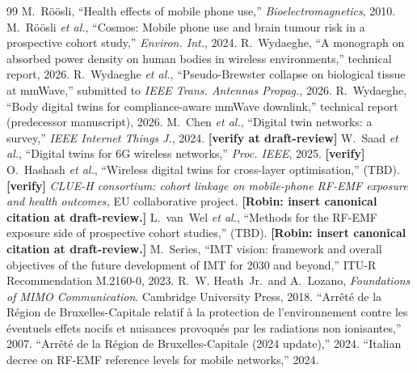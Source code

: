 \documentclass[journal,twocolumn,10pt]{IEEEtran}
\theoremstyle{plain}
\theoremstyle{definition}
\theoremstyle{remark}
\begin{document}
\begin{thebibliography}{99}
 M.~R\"o\"osli, ``Health effects of mobile phone
use,'' \emph{Bioelectromagnetics}, 2010.
 M.~R\"o\"osli \emph{et al.}, ``Cosmos: Mobile
phone use and brain tumour risk in a prospective cohort study,''
\emph{Environ. Int.}, 2024.
 R.~Wydaeghe, ``A monograph on absorbed
power density on human bodies in wireless environments,'' technical
report, 2026.
 R.~Wydaeghe \emph{et al.}, ``Pseudo-Brewster
collapse on biological tissue at mmWave,'' submitted to \emph{IEEE
Trans. Antennas Propag.}, 2026.
 R.~Wydaeghe, ``Body digital twins for
compliance-aware mmWave downlink,'' technical report (predecessor
manuscript), 2026.
 M.~Chen \emph{et al.}, ``Digital twin
networks: a survey,'' \emph{IEEE Internet Things J.}, 2024.
\textbf{[verify at draft-review]}
 W.~Saad \emph{et al.}, ``Digital twins for
6G wireless networks,'' \emph{Proc. IEEE}, 2025. \textbf{[verify]}
 O.~Hashash \emph{et al.}, ``Wireless
digital twins for cross-layer optimisation,'' (TBD).
\textbf{[verify]}
 \emph{CLUE-H consortium: cohort linkage on
mobile-phone RF-EMF exposure and health outcomes,} EU collaborative
project. \textbf{[Robin: insert canonical citation at draft-review.]}
 L.~van~Wel \emph{et al.}, ``Methods for the
RF-EMF exposure side of prospective cohort studies,'' (TBD).
\textbf{[Robin: insert canonical citation at draft-review.]}
 M.~Series, ``IMT vision: framework and overall
objectives of the future development of IMT for 2030 and beyond,''
ITU-R Recommendation M.2160-0, 2023.
 R.~W. Heath~Jr.\ and A.~Lozano,
\emph{Foundations of MIMO Communication}. Cambridge University
Press, 2018.
 ``Arr\^et\'e de la R\'egion de
Bruxelles-Capitale relatif \`a la protection de l'environnement
contre les \'eventuels effets nocifs et nuisances provoqu\'es par
les radiations non ionisantes,'' 2007.
 ``Arr\^et\'e de la R\'egion de
Bruxelles-Capitale (2024 update),'' 2024.
 ``Italian decree on RF-EMF reference levels for
mobile networks,'' 2024.
\end{thebibliography}
\end{document}
